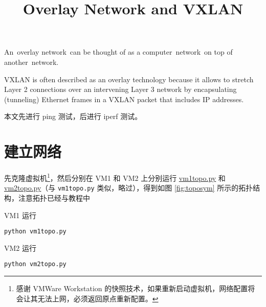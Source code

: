\endofdump
{}

    \title{Overlay Network and VXLAN}
    \maketitle
    \tableofcontents
    \vfill
    An overlay network can be thought of as a computer network on top of another network. 

    VXLAN is often described as an overlay technology because it allows to stretch Layer 2 connections over an intervening Layer 3 network by encapsulating (tunneling) Ethernet frames in a VXLAN packet that includes IP addresses.

    本文先进行 ping 测试，后进行 iperf 测试。
    \vfill
    \clearpage
    \section{建立网络}

    先克隆虚拟机\footnote{感谢 VMWare Workstation 的快照技术，如果重新启动虚拟机，网络配置将会让其无法上网，必须返回原点重新配置。}，然后分别在 VM1 和 VM2 上分别运行 \href{run:vm1topo.py}{vm1topo.py} 和 \href{run:vm2topo.py}{vm2topo.py}（与 \verb"vm1topo.py" 类似，略过），得到如图 \ref{fig:toposym} 所示的拓扑结构，注意拓扑已经与教程中





    VM1 运行
    \begin{lstlisting}[style=commandshell]
python vm1topo.py\end{lstlisting}

    VM2 运行
    \begin{lstlisting}[style=commandshell]
python vm2topo.py\end{lstlisting}

